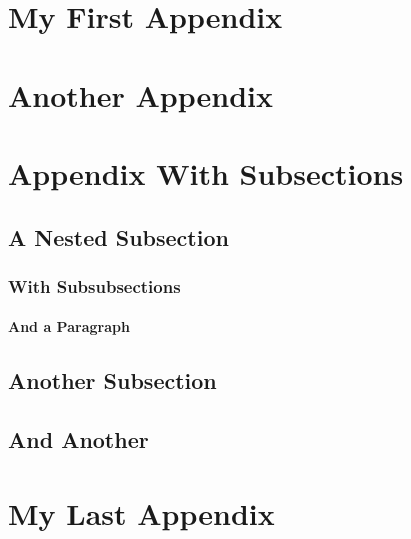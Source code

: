 \lipsum[3]

\section{My First Appendix}\label{sec:app:test1}

\section{Another Appendix}\label{sec:app:test2}

\section{Appendix With Subsections}\label{sec:app:test3}

\subsection{A Nested Subsection}

\subsubsection{With Subsubsections}

\paragraph{And a Paragraph}

\subsection{Another Subsection}

\subsection{And Another}

\section{My Last Appendix}\label{sec:app:test4}